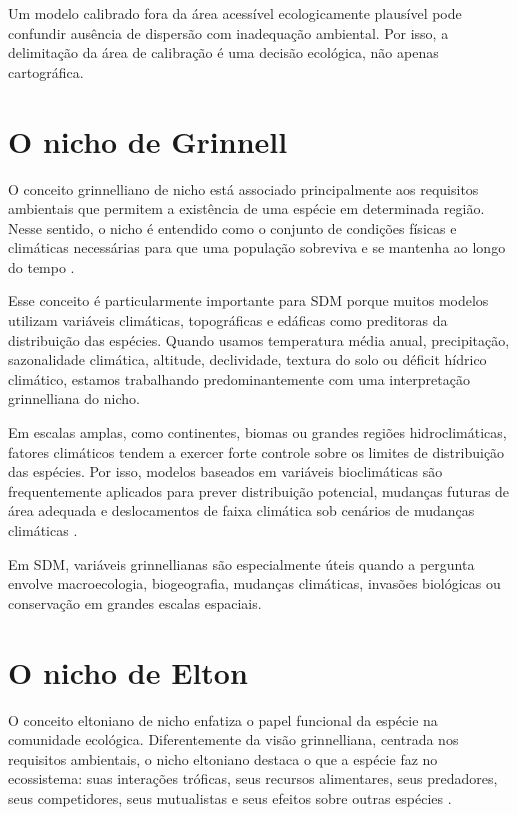 \begin{atencao}
Um modelo calibrado fora da área acessível ecologicamente plausível pode confundir ausência de dispersão com inadequação ambiental. Por isso, a delimitação da área de calibração é uma decisão ecológica, não apenas cartográfica.
\end{atencao}

\section{O nicho de Grinnell}

O conceito grinnelliano de nicho está associado principalmente aos requisitos ambientais que permitem a existência de uma espécie em determinada região. Nesse sentido, o nicho é entendido como o conjunto de condições físicas e climáticas necessárias para que uma população sobreviva e se mantenha ao longo do tempo \parencite{grinnell1917,soberon2007}.

Esse conceito é particularmente importante para SDM porque muitos modelos utilizam variáveis climáticas, topográficas e edáficas como preditoras da distribuição das espécies. Quando usamos temperatura média anual, precipitação, sazonalidade climática, altitude, declividade, textura do solo ou déficit hídrico climático, estamos trabalhando predominantemente com uma interpretação grinnelliana do nicho.

Em escalas amplas, como continentes, biomas ou grandes regiões hidroclimáticas, fatores climáticos tendem a exercer forte controle sobre os limites de distribuição das espécies. Por isso, modelos baseados em variáveis bioclimáticas são frequentemente aplicados para prever distribuição potencial, mudanças futuras de área adequada e deslocamentos de faixa climática sob cenários de mudanças climáticas \parencite{guisan2005predicting,elith2009,guisan2017habitat}.

\begin{dica}[title={\faLightbulb\quad dica}]
Em SDM, variáveis grinnellianas são especialmente úteis quando a pergunta envolve macroecologia, biogeografia, mudanças climáticas, invasões biológicas ou conservação em grandes escalas espaciais.
\end{dica}

\section{O nicho de Elton}

O conceito eltoniano de nicho enfatiza o papel funcional da espécie na comunidade ecológica. Diferentemente da visão grinnelliana, centrada nos requisitos ambientais, o nicho eltoniano destaca o que a espécie faz no ecossistema: suas interações tróficas, seus recursos alimentares, seus predadores, seus competidores, seus mutualistas e seus efeitos sobre outras espécies \parencite{elton1927,soberon2007}.

